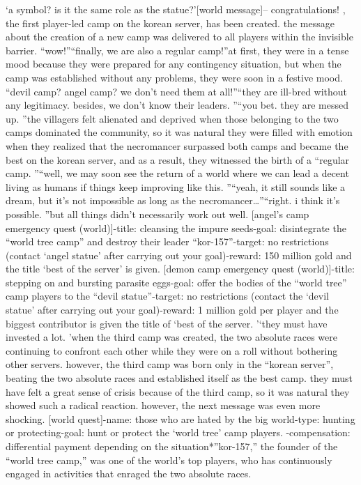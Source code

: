 ‘a symbol? is it the same role as the statue?’[world message]– congratulations! , the first player-led camp on the korean server, has been created.
the message about the creation of a new camp was delivered to all players within the invisible barrier.
“wow!”“finally, we are also a regular camp!”at first, they were in a tense mood because they were prepared for any contingency situation, but when the camp was established without any problems, they were soon in a festive mood.
“devil camp? angel camp? we don’t need them at all!”“they are ill-bred without any legitimacy.
 besides, we don’t know their leaders.
”“you bet.
 they are messed up.
”the villagers felt alienated and deprived when those belonging to the two camps dominated the community, so it was natural they were filled with emotion when they realized that the necromancer surpassed both camps and became the best on the korean server, and as a result, they witnessed the birth of a “regular camp.
”“well, we may soon see the return of a world where we can lead a decent living as humans if things keep improving like this.
”“yeah, it still sounds like a dream, but it’s not impossible as long as the necromancer…”“right.
 i think it’s possible.
”but all things didn’t necessarily work out well.
[angel’s camp emergency quest (world)]-title: cleansing the impure seeds-goal: disintegrate the “world tree camp” and destroy their leader “kor-157”-target: no restrictions (contact ‘angel statue’ after carrying out your goal)-reward: 150 million gold and the title ‘best of the server’ is given.
[demon camp emergency quest (world)]-title: stepping on and bursting parasite eggs-goal: offer the bodies of the “world tree” camp players to the “devil statue”-target: no restrictions (contact the ‘devil statue’ after carrying out your goal)-reward: 1 million gold per player and the biggest contributor is given the title of ‘best of the server.
’‘they must have invested a lot.
’when the third camp was created, the two absolute races were continuing to confront each other while they were on a roll without bothering other servers.
however, the third camp was born only in the “korean server”, beating the two absolute races and established itself as the best camp.
they must have felt a great sense of crisis because of the third camp, so it was natural they showed such a radical reaction.
however, the next message was even more shocking.
[world quest]-name: those who are hated by the big world-type: hunting or protecting-goal: hunt or protect the ‘world tree’ camp players.
-compensation: differential payment depending on the situation*”kor-157,” the founder of the “world tree camp,” was one of the world’s top players, who has continuously engaged in activities that enraged the two absolute races.

